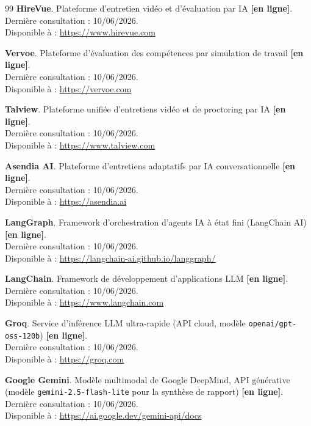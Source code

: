 \begin{thebibliography}{99}
\textbf{HireVue}. Plateforme d'entretien vidéo et d'évaluation par IA \textbf{[en ligne]}.\\
Dernière consultation : 10/06/2026.\\
Disponible à : \url{https://www.hirevue.com}

\textbf{Vervoe}. Plateforme d'évaluation des compétences par simulation de travail \textbf{[en ligne]}.\\
Dernière consultation : 10/06/2026.\\
Disponible à : \url{https://vervoe.com}

\textbf{Talview}. Plateforme unifiée d'entretiens vidéo et de proctoring par IA \textbf{[en ligne]}.\\
Dernière consultation : 10/06/2026.\\
Disponible à : \url{https://www.talview.com}

\textbf{Asendia AI}. Plateforme d'entretiens adaptatifs par IA conversationnelle \textbf{[en ligne]}.\\
Dernière consultation : 10/06/2026.\\
Disponible à : \url{https://asendia.ai}

\textbf{LangGraph}. Framework d'orchestration d'agents IA à état fini (LangChain AI) \textbf{[en ligne]}.\\
Dernière consultation : 10/06/2026.\\
Disponible à : \url{https://langchain-ai.github.io/langgraph/}

\textbf{LangChain}. Framework de développement d'applications LLM \textbf{[en ligne]}.\\
Dernière consultation : 10/06/2026.\\
Disponible à : \url{https://www.langchain.com}

\textbf{Groq}. Service d'inférence LLM ultra-rapide (API cloud, modèle \texttt{openai/gpt-oss-120b}) \textbf{[en ligne]}.\\
Dernière consultation : 10/06/2026.\\
Disponible à : \url{https://groq.com}

\textbf{Google Gemini}. Modèle multimodal de Google DeepMind, API générative (modèle \texttt{gemini-2.5-flash-lite} pour la synthèse de rapport) \textbf{[en ligne]}.\\
Dernière consultation : 10/06/2026.\\
Disponible à : \url{https://ai.google.dev/gemini-api/docs}


\end{thebibliography}
